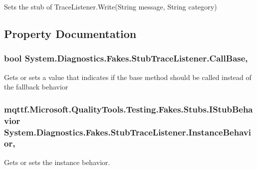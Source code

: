 Sets the stub of Trace\-Listener.\-Write(\-String message, String category)



\subsection{Property Documentation}
\hypertarget{class_system_1_1_diagnostics_1_1_fakes_1_1_stub_trace_listener_a9f5913f9d43a0a4104c15f0e3565082f}{
\subsubsection[{Call\-Base}]{\setlength{\rightskip}{0pt plus 5cm}bool System.\-Diagnostics.\-Fakes.\-Stub\-Trace\-Listener.\-Call\-Base\hspace{0.3cm}{\ttfamily [get]}, {\ttfamily [set]}}}\label{class_system_1_1_diagnostics_1_1_fakes_1_1_stub_trace_listener_a9f5913f9d43a0a4104c15f0e3565082f}


Gets or sets a value that indicates if the base method should be called instead of the fallback behavior

\hypertarget{class_system_1_1_diagnostics_1_1_fakes_1_1_stub_trace_listener_a6618642aa59525ed24226fb9c0eb0204}{
\subsubsection[{Instance\-Behavior}]{\setlength{\rightskip}{0pt plus 5cm}mqttf.\-Microsoft.\-Quality\-Tools.\-Testing.\-Fakes.\-Stubs.\-I\-Stub\-Behavior System.\-Diagnostics.\-Fakes.\-Stub\-Trace\-Listener.\-Instance\-Behavior\hspace{0.3cm}{\ttfamily [get]}, {\ttfamily [set]}}}\label{class_system_1_1_diagnostics_1_1_fakes_1_1_stub_trace_listener_a6618642aa59525ed24226fb9c0eb0204}


Gets or sets the instance behavior.

